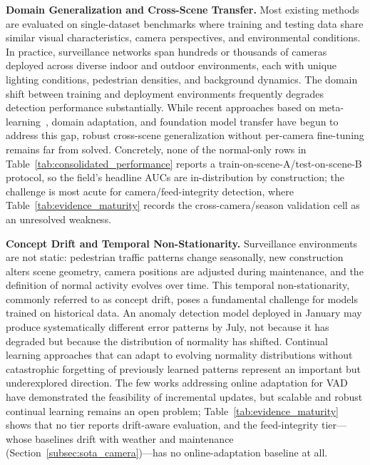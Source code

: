 \documentclass[10pt,a4paper]{article}
\begin{document}
\noindent\textbf{Domain Generalization and Cross-Scene Transfer.} Most existing methods are evaluated on single-dataset benchmarks where training and testing data share similar visual characteristics, camera perspectives, and environmental conditions. In practice, surveillance networks span hundreds or thousands of cameras deployed across diverse indoor and outdoor environments, each with unique lighting conditions, pedestrian densities, and background dynamics. The domain shift between training and deployment environments frequently degrades detection performance substantially. While recent approaches based on meta-learning~\citep{lu2020few}, domain adaptation, and foundation model transfer have begun to address this gap, robust cross-scene generalization without per-camera fine-tuning remains far from solved. Concretely, none of the normal-only rows in Table~\ref{tab:consolidated_performance} reports a train-on-scene-A/test-on-scene-B protocol, so the field's headline AUCs are in-distribution by construction; the challenge is most acute for camera/feed-integrity detection, where Table~\ref{tab:evidence_maturity} records the cross-camera/season validation cell as an unresolved weakness.

\noindent\textbf{Concept Drift and Temporal Non-Stationarity.} Surveillance environments are not static: pedestrian traffic patterns change seasonally, new construction alters scene geometry, camera positions are adjusted during maintenance, and the definition of normal activity evolves over time. This temporal non-stationarity, commonly referred to as concept drift, poses a fundamental challenge for models trained on historical data. An anomaly detection model deployed in January may produce systematically different error patterns by July, not because it has degraded but because the distribution of normality has shifted. Continual learning approaches that can adapt to evolving normality distributions without catastrophic forgetting of previously learned patterns represent an important but underexplored direction. The few works addressing online adaptation for VAD~\citep{doshi2020continual} have demonstrated the feasibility of incremental updates,  but scalable and robust continual learning remains an open problem; Table~\ref{tab:evidence_maturity} shows that no tier reports drift-aware evaluation, and the feed-integrity tier---whose baselines drift with weather and maintenance (Section~\ref{subsec:sota_camera})---has no online-adaptation baseline at all.
\end{document}
